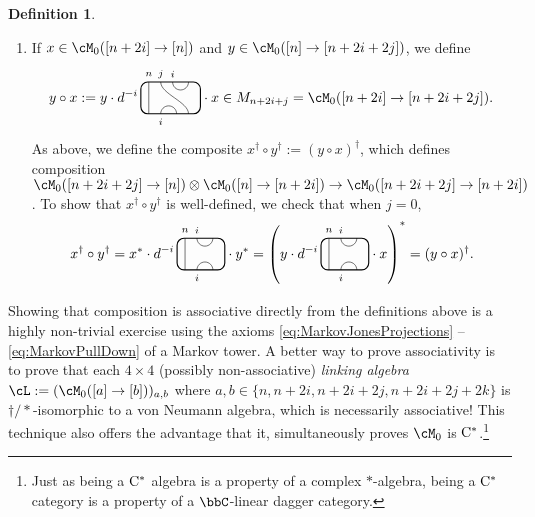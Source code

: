 \documentclass[11pt]{article}
\theoremstyle{plain}
\theoremstyle{definition}
\newtheorem{defn}[thm]{Definition}
\newcommand{\Cstar}{\rm{C^*}}
\begin{document}
\begin{defn}
\begin{itemize}
\begin{enumerate}[label={\rm(C\arabic*)}]
\item
\label{compose:downup}
If $x\in \cM_0([n+2i] \to [n])$ and $y\in \cM_0([n] \to [n+2i+2j])$, we define
$$
y\circ x 
:=
y\cdot
d^{-i}\,
\begin{tikzpicture}[baseline = .3cm]
 \draw[thick, rounded corners = 5pt] (0,0) rectangle (1.5,.8);
 \draw (.2,0) -- (.2,.8);
 \draw (.8,.8) arc (-180:0:.2cm);
 \draw (1.2,0) .. controls ++(90:.3cm) and ++(270:.3cm) .. (.5,.8);
 \draw (.5,0) arc (180:0:.2cm);
 \node at (.2,1) {\scriptsize{$n$}};
 \node at (.5,1) {\scriptsize{$j$}};
 \node at (.8,1) {\scriptsize{$i$}};
 \node at (.5,-.2) {\scriptsize{$i$}};
\end{tikzpicture}
\cdot x
\in
M_{n+2i+j}
=
\cM_0([n+2i] \to [n+2i+2j]).
$$
As above, we define the composite $x^\dag \circ y^\dag := (y\circ x)^\dag$, which defines composition
$\cM_0([n+2i+2j] \to [n]) \otimes \cM_0([n] \to [n+2i]) \to \cM_0([n+2i+2j] \to [n+2i])$.
To show that $x^\dag \circ y^\dag$ is well-defined, we check that when $j=0$, 
\begin{equation}
\label{eq:n+2j to n to n+2j}
x^\dag \circ y^\dag 
=
x^* \cdot
d^{-i}\,
\begin{tikzpicture}[baseline = .3cm]
 \draw[thick, rounded corners = 5pt] (0,0) rectangle (1.2,.8);
 \draw (.2,0) -- (.2,.8);
 \draw (.5,.8) arc (-180:0:.2cm);
 \draw (.5,0) arc (180:0:.2cm);
 \node at (.2,1) {\scriptsize{$n$}};
 \node at (.5,1) {\scriptsize{$i$}};
 \node at (.5,-.2) {\scriptsize{$i$}};
\end{tikzpicture}
\cdot y^*
=
\left(
y \cdot
d^{-i}\,
\begin{tikzpicture}[baseline = .3cm]
 \draw[thick, rounded corners = 5pt] (0,0) rectangle (1.2,.8);
 \draw (.2,0) -- (.2,.8);
 \draw (.5,.8) arc (-180:0:.2cm);
 \draw (.5,0) arc (180:0:.2cm);
 \node at (.2,1) {\scriptsize{$n$}};
 \node at (.5,1) {\scriptsize{$i$}};
 \node at (.5,-.2) {\scriptsize{$i$}};
\end{tikzpicture}
\cdot x
\right)^*
=
(y\circ x)^\dag.
\end{equation}
\end{enumerate}
\end{itemize}
Showing that composition is associative directly from the definitions above is a highly non-trivial exercise using the axioms \ref{eq:MarkovJonesProjections} -- \ref{eq:MarkovPullDown} of a Markov tower.
A better way to prove associativity is to prove that each $4\times 4$ (possibly non-associative) \emph{linking algebra} \cite{MR808930} 
$\cL:=(\cM_0([a] \to[b]))_{a,b}$ where $a,b\in \{n, n+2i, n+2i+2j, n+2i+2j+2k \}$
is $\dag/*$-isomorphic to a von Neumann algebra, which is necessarily associative!
This technique also offers the advantage that it, simultaneously proves $\cM_0$ is $\Cstar$.\footnote{
Just as being a $\Cstar$ algebra is a property of a complex $*$-algebra, being a $\Cstar$ category is a property of a $\bbC$-linear dagger category.
}


\end{defn}
\end{document}
